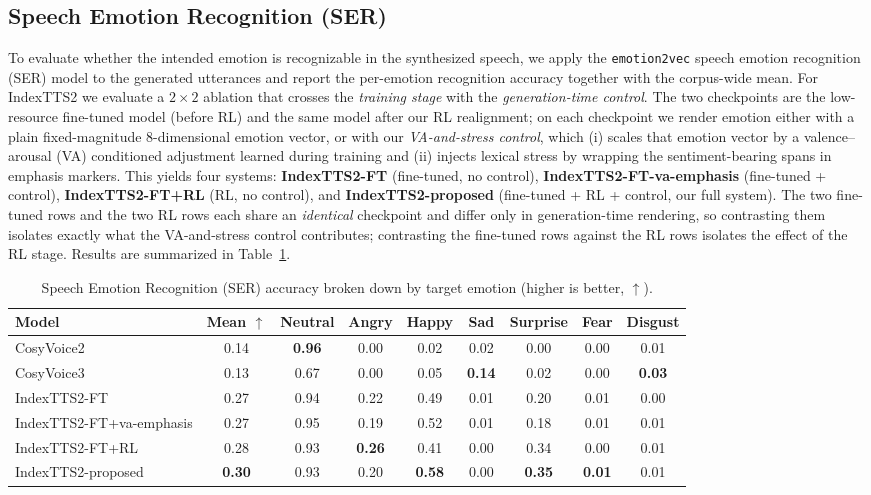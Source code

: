 \subsection{Speech Emotion Recognition (SER)}
\label{section:exp:ser}
To evaluate whether the intended emotion is recognizable in the synthesized speech, we apply the \texttt{emotion2vec} speech emotion recognition (SER) model to the generated utterances and report the per-emotion recognition accuracy together with the corpus-wide mean. For IndexTTS2 we evaluate a $2\times2$ ablation that crosses the \emph{training stage} with the \emph{generation-time control}. The two checkpoints are the low-resource fine-tuned model (before RL) and the same model after our RL realignment; on each checkpoint we render emotion either with a plain fixed-magnitude 8-dimensional emotion vector, or with our \emph{VA-and-stress control}, which (i) scales that emotion vector by a valence--arousal (VA) conditioned adjustment learned during training and (ii) injects lexical stress by wrapping the sentiment-bearing spans in emphasis markers. This yields four systems: \textbf{IndexTTS2-FT} (fine-tuned, no control), \textbf{IndexTTS2-FT-va-emphasis} (fine-tuned + control), \textbf{IndexTTS2-FT+RL} (RL, no control), and \textbf{IndexTTS2-proposed} (fine-tuned + RL + control, our full system). The two fine-tuned rows and the two RL rows each share an \emph{identical} checkpoint and differ only in generation-time rendering, so contrasting them isolates exactly what the VA-and-stress control contributes; contrasting the fine-tuned rows against the RL rows isolates the effect of the RL stage. Results are summarized in Table~\ref{tab:ser_by_emotion}.

\begin{table}[htbp]
\centering
\small
\caption{Speech Emotion Recognition (SER) accuracy broken down by target emotion (higher is better, $\uparrow$).}
\label{tab:ser_by_emotion}
\setlength{\tabcolsep}{4pt}
\begin{tabular}{lcccccccc}
\toprule
\textbf{Model} & \textbf{Mean $\uparrow$} & \textbf{Neutral} & \textbf{Angry} & \textbf{Happy} & \textbf{Sad} & \textbf{Surprise} & \textbf{Fear} & \textbf{Disgust} \\
\midrule
CosyVoice2 & 0.14 & \textbf{0.96} & 0.00 & 0.02 & 0.02 & 0.00 & 0.00 & 0.01 \\
CosyVoice3 & 0.13 & 0.67 & 0.00 & 0.05 & \textbf{0.14} & 0.02 & 0.00 & \textbf{0.03} \\
IndexTTS2-FT & 0.27 & 0.94 & 0.22 & 0.49 & 0.01 & 0.20 & 0.01 & 0.00 \\
IndexTTS2-FT+va-emphasis & 0.27 & 0.95 & 0.19 & 0.52 & 0.01 & 0.18 & 0.01 & 0.01 \\
IndexTTS2-FT+RL & 0.28 & 0.93 & \textbf{0.26} & 0.41 & 0.00 & 0.34 & 0.00 & 0.01 \\
IndexTTS2-proposed & \textbf{0.30} & 0.93 & 0.20 & \textbf{0.58} & 0.00 & \textbf{0.35} & \textbf{0.01} & 0.01 \\
\bottomrule
\end{tabular}
\end{table}

